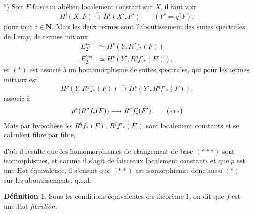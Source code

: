 \documentclass[11pt]{article}
\newcommand{\msp}[1]{\marginpar{\footnotesize [#1]}}
\newcommand{\Hot}{\mathrm{Hot}}
\begin{document}
$^o$) Soit $F$ faisceau abélien localement constant sur $X$, il faut voir
\[
H^i(X,F) \xrightarrow{\ \sim\ } H^i(X', F') \qquad (F' = q^*F), \tag*{$(*)$}
\]
pour tout $i \in \mathbf{N}$. Mais les deux termes sont l'aboutissement des suites spectrales de Leray, de termes initiaux
\[
\begin{aligned}
E_2^{pq} &\simeq H^p(Y, R^q f_*(F)) \\
E^{\prime pq}_2 &\simeq H^p(Y', R^q f'_*(F')),
\end{aligned}
\]
et $(*)$ est associé à un homomorphisme de suites spectrales, qui pour les termes initiaux est
\[
H^p(Y, R^q f_*(F)) \xrightarrow{\sim} H^p(Y', R^q f'_*(F)), \tag*{$(**)$} %
\]
associé à
\[
p^*(R^q f_*(F)) \longrightarrow R^q f'_*(F'). \tag*{$(*{*}*)$}
\]
Mais par hypothèse les $R^q f_*(F)$, $R^q f'_*(F')$ sont localement constants et se calculent fibre par fibre,

\msp{page 131}

\noindent d'où il résulte que les homomorphismes de changement de base $(*{*}*)$ sont isomorphismes, et comme il s'agit de faisceaux localement constants et que $p$ est une $\Hot$-équivalence, il s'ensuit que $(**)$ est isomorphisme, donc aussi $(*)$ sur les aboutissements, q.e.d.

\noindent\textbf{Définition 1.} Sous les conditions équivalentes du théorème 1, on dit que $f$ est une $\Hot$-\textit{fibration.}
\end{document}
